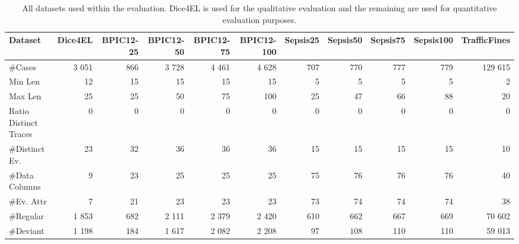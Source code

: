 \begin{table}
\caption{All datasets used within the evaluation. Dice4EL is used for the qualitative evaluation and the remaining are used for quantitative evaluation purposes.}
\label{tbl:dataset-stats}
\begin{tabular}{lrrrrrrrrrr}
\toprule
Dataset & Dice4EL & BPIC12-25 & BPIC12-50 & BPIC12-75 & BPIC12-100 & Sepsis25 & Sepsis50 & Sepsis75 & Sepsis100 & TrafficFines \\
\midrule
\#Cases & 3 051 & 866 & 3 728 & 4 461 & 4 628 & 707 & 770 & 777 & 779 & 129 615 \\
Min Len & 12 & 15 & 15 & 15 & 15 & 5 & 5 & 5 & 5 & 2 \\
Max Len & 25 & 25 & 50 & 75 & 100 & 25 & 47 & 66 & 88 & 20 \\
Ratio Distinct Traces & 0 & 0 & 0 & 0 & 0 & 0 & 0 & 0 & 0 & 0 \\
\#Distinct Ev. & 23 & 32 & 36 & 36 & 36 & 15 & 15 & 15 & 15 & 10 \\
\#Data Columns & 9 & 23 & 25 & 25 & 25 & 75 & 76 & 76 & 76 & 40 \\
\#Ev. Attr & 7 & 21 & 23 & 23 & 23 & 73 & 74 & 74 & 74 & 38 \\
\#Regular & 1 853 & 682 & 2 111 & 2 379 & 2 420 & 610 & 662 & 667 & 669 & 70 602 \\
\#Deviant & 1 198 & 184 & 1 617 & 2 082 & 2 208 & 97 & 108 & 110 & 110 & 59 013 \\
\bottomrule
\end{tabular}
\end{table}
